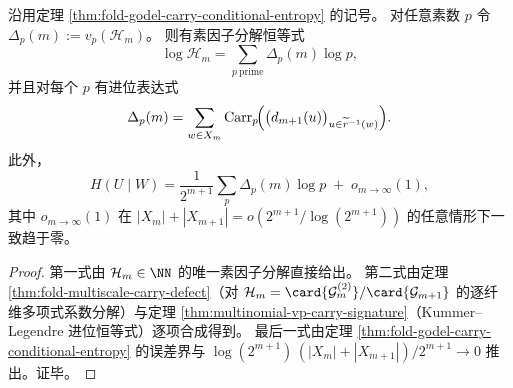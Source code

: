 \begin{corollary}[素数进位谱分解与条件熵读出]\label{cor:fold-godel-carry-spectrum-conditional-entropy}
沿用定理 \ref{thm:fold-godel-carry-conditional-entropy} 的记号。
对任意素数 \(p\) 令 \(\Delta_p(m):=v_p(\mathcal H_m)\)。
则有素因子分解恒等式
\[
\log\mathcal H_m=\sum_{p\ \mathrm{prime}}\Delta_p(m)\log p,
\]
并且对每个 \(p\) 有进位表达式
\[
\Delta_p(m)
=
\sum_{w\in X_m}
\mathrm{Carr}_p\!\Bigl(\bigl(d_{m+1}(u)\bigr)_{u\in\widetilde r^{-1}(w)}\Bigr).
\]
此外，
\[
H(U\mid W)=\frac{1}{2^{m+1}}\sum_{p}\Delta_p(m)\log p\;+\;o_{m\to\infty}(1),
\]
其中 \(o_{m\to\infty}(1)\) 在 \(|X_m|+|X_{m+1}|=o(2^{m+1}/\log(2^{m+1}))\) 的任意情形下一致趋于零。
\end{corollary}
\begin{proof}
第一式由 \(\mathcal H_m\in\NN\) 的唯一素因子分解直接给出。
第二式由定理 \ref{thm:fold-multiscale-carry-defect}（对 \(\mathcal H_m=\card{\mathcal{G}_m^{(2)}}/\card{\mathcal{G}_{m+1}}\) 的逐纤维多项式系数分解）与定理 \ref{thm:multinomial-vp-carry-signature}（Kummer--Legendre 进位恒等式）逐项合成得到。
最后一式由定理 \ref{thm:fold-godel-carry-conditional-entropy} 的误差界与
\(
\log(2^{m+1})\,(|X_m|+|X_{m+1}|)/2^{m+1}\to 0
\)
推出。证毕。
\end{proof}

